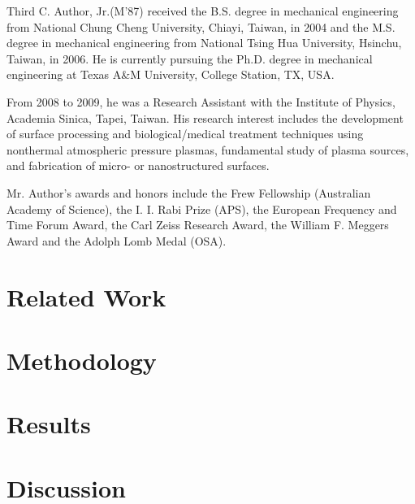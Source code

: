 \documentclass[journal]{IEEEtai}
\begin{document}
\begin{IEEEbiography}{Third C. Author, Jr.}{\space}(M’87) received the B.S. degree in mechanical engineering from National Chung Cheng University, Chiayi, Taiwan, in 2004 and the M.S. degree in mechanical engineering from National Tsing Hua University, Hsinchu, Taiwan, in 2006. He is currently pursuing the Ph.D. degree in mechanical engineering at Texas A\&M University, College Station, TX, USA.

    From 2008 to 2009, he was a Research Assistant with the Institute of Physics, Academia Sinica, Tapei, Taiwan. His research interest includes\vadjust{\vfill\pagebreak} the development of surface processing and biological/medical treatment techniques using nonthermal atmospheric pressure plasmas, fundamental study of plasma sources, and fabrication of micro- or nanostructured surfaces. 

   Mr. Author’s awards and honors include the Frew Fellowship (Australian Academy of Science), the I. I. Rabi Prize (APS), the European Frequency and Time Forum Award, the Carl Zeiss Research Award, the William F. Meggers Award and the Adolph Lomb Medal (OSA).
\end{IEEEbiography}


\section{Related Work}


\section{Methodology}


\section{Results}


\section{Discussion}
\end{document}
